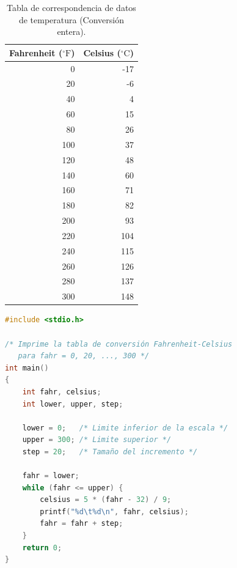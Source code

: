 \documentclass[11pt, a4paper]{article}
\begin{document}
\begin{table}[htbp]
    \centering
    \small
    \begin{tabular}{rr}
        \toprule
        \textbf{Fahrenheit ($^{\circ}\text{F}$)} & \textbf{Celsius ($^{\circ}\text{C}$)} \\
        \midrule
        0   & -17 \\
        20  & -6  \\
        40  & 4   \\
        60  & 15  \\
        80  & 26  \\
        100 & 37  \\
        120 & 48  \\
        140 & 60  \\
        160 & 71  \\
        180 & 82  \\
        200 & 93  \\
        220 & 104 \\
        240 & 115 \\
        260 & 126 \\
        280 & 137 \\
        300 & 148 \\
        \bottomrule
    \end{tabular}
    \caption{Tabla de correspondencia de datos de temperatura (Conversión entera).}
    \label{tab:datos_conversion}
\end{table}

\begin{lstlisting}[language=C, caption={Programa de conversión Fahrenheit-Celsius (Versión entera)}, path={/Ejercicios/fahrenheit-celsius/f-to-c.c}]
#include <stdio.h>

/* Imprime la tabla de conversión Fahrenheit-Celsius
   para fahr = 0, 20, ..., 300 */
int main()
{
    int fahr, celsius;
    int lower, upper, step;

    lower = 0;   /* Limite inferior de la escala */
    upper = 300; /* Limite superior */
    step = 20;   /* Tamaño del incremento */

    fahr = lower;
    while (fahr <= upper) {
        celsius = 5 * (fahr - 32) / 9;
        printf("%d\t%d\n", fahr, celsius);
        fahr = fahr + step;
    }
    return 0;
}
\end{lstlisting}
\end{document}
